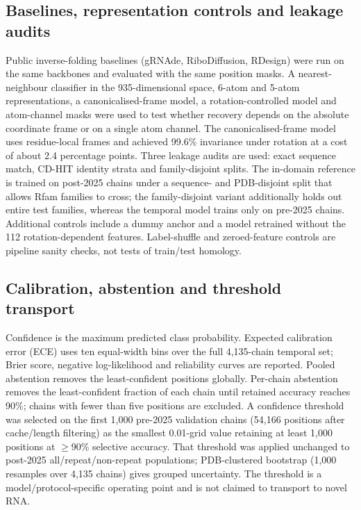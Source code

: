 \subsection{Baselines, representation controls and leakage audits}
Public inverse-folding baselines (gRNAde, RiboDiffusion, RDesign) were run on the
same backbones and evaluated with the same position masks. A nearest-neighbour
classifier in the 935-dimensional space, 6-atom and 5-atom representations, a
canonicalised-frame model, a rotation-controlled model and atom-channel masks were used to test
whether recovery depends on the absolute coordinate frame or on a single atom channel. The
canonicalised-frame model uses residue-local frames and achieved 99.6\% invariance
under rotation at a cost of about 2.4 percentage points. Three leakage audits are
used: exact sequence match, CD-HIT identity strata and family-disjoint splits.
The in-domain reference is trained on post-2025 chains under a sequence- and
PDB-disjoint split that allows Rfam families to cross; the family-disjoint variant
additionally holds out entire test families, whereas the temporal model trains only
on pre-2025 chains. Additional controls include a dummy anchor and a model
retrained without the 112 rotation-dependent features. Label-shuffle and
zeroed-feature controls are pipeline sanity checks, not tests of train/test homology.

\subsection{Calibration, abstention and threshold transport}
Confidence is the maximum predicted class probability. Expected calibration error
(ECE) uses ten equal-width bins over the full 4,135-chain temporal set; Brier score,
negative log-likelihood and reliability curves are reported. Pooled abstention
removes the least-confident positions globally. Per-chain abstention removes the
least-confident fraction of each chain until retained accuracy reaches 90\%;
chains with fewer than five positions are excluded. A confidence threshold was
selected on the first 1,000 pre-2025 validation chains (54,166 positions after
cache/length filtering) as the smallest 0.01-grid value retaining at least 1,000
positions at $\ge$90\% selective accuracy. That threshold was applied unchanged to
post-2025 all/repeat/non-repeat populations; PDB-clustered bootstrap (1,000
resamples over 4,135 chains) gives grouped uncertainty. The threshold is a
model/protocol-specific operating point and is not claimed to transport to novel
RNA.


